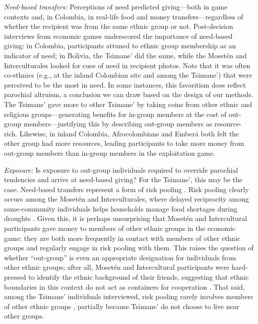 \documentclass[bibauthoryear]{aa}
\begin{document}
\emph{Need-based transfers:} Perceptions of need predicted giving---both in game contexts and, in  Colombia, in real-life food and money transfers---regardless of whether the recipient was from the same ethnic group or not. Post-decision interviews from economic games underscored the importance of need-based giving: in Colombia, participants attuned to ethnic group membership as an indicator of need; in Bolivia, the Tsimane' did the same, while the Moset\'en and Interculturales looked for cues of need in recipient photos. Note that it was often co-ethnics (e.g., at the inland Colombian site and among the Tsimane') that were perceived to be the most in need. In some instances, this favoritism does reflect parochial altruism, a conclusion we can draw based on the design of our methods. The Tsimane' gave more to other Tsimane' by taking coins from other ethnic and religious groups---generating benefits for in-group members at the cost of out-group members---justifying this by describing out-group members as resource-rich. Likewise, in inland Colombia, Afrocolombians and Ember\'a both felt the other group had more resources, leading  participants to take more money from out-group members than in-group members in the exploitation game.  

\emph{Exposure:} Is exposure to out-group individuals required to override parochial tendencies and arrive at need-based giving? For the Tsimane', this may be the case. Need-based transfers represent a form of risk pooling \citep{cronk2019managing}. Risk pooling clearly occurs among the Moset\'en and Interculturales, where delayed reciprocity among same-community individuals helps households manage food shortages during droughts \citep{pisorjones2020}. Given this, it is perhaps unsurprising that Moset\'en and Intercultural participants gave money to members of other ethnic groups in the economic game: they are both more frequently in contact with members of other ethnic groups and regularly engage in risk pooling with them. This raises the question of whether ``out-group'' is even an appropriate designation for individuals from other ethnic groups; after all, Moset\'en and Intercultural participants were hard-pressed to identify the ethnic background of their friends, suggesting that ethnic boundaries in this context do not act as containers for cooperation  \citep[e.g.,][]{brewer1976ethnocentrism, moya2015different}. That said, among the Tsimane' individuals interviewed, risk pooling rarely involves members of other ethnic groups  \citep[see also][]{jaeggi2016reciprocal}, partially because Tsimane' do not choose to live near other groups. %
\end{document}
